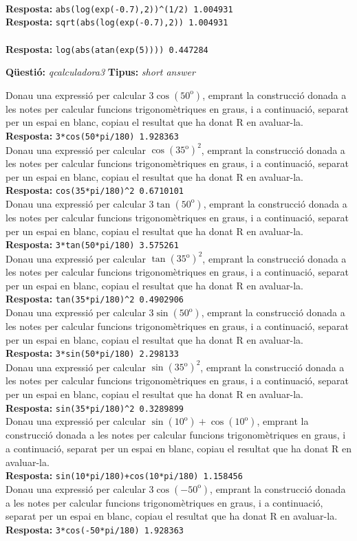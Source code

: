 \documentclass[10pt]{article}
\newcommand{\answer}{\textbf{Resposta: }}
\newcommand{\newquestion}[2]{\noindent\textbf{Qüestió: }\emph{#1} \textbf{Tipus: }\emph{#2}\medskip}
\begin{document}
\\
\answer{\verb?abs(log(exp(-0.7),2))^(1/2) 1.004931?}\\
\answer{\verb?sqrt(abs(log(exp(-0.7),2)) 1.004931?}\\

\\
\answer{\verb?log(abs(atan(exp(5)))) 0.447284?}\\

\newpage

\newquestion{qcalculadora3}{short answer} 
\def\qcalculadora3#1{Donau una expressió per calcular $#1$, emprant la construcció donada a les notes per calcular funcions trigonomètriques en graus, i a continuació, separat per un espai en blanc, copiau el resultat que ha donat R en avaluar-la.}

\qcalculadora3{3\cos(50^{\mathrm{o}})}\\
\answer{\verb?3*cos(50*pi/180) 1.928363?}\\

\qcalculadora3{\cos(35^{\mathrm{o}})^2}\\
\answer{\verb?cos(35*pi/180)^2 0.6710101?}\\

\qcalculadora3{3\tan(50^{\mathrm{o}})}\\
\answer{\verb?3*tan(50*pi/180) 3.575261?}\\

\qcalculadora3{\tan(35^{\mathrm{o}})^2}\\
\answer{\verb?tan(35*pi/180)^2 0.4902906?}\\

\qcalculadora3{3\sin(50^{\mathrm{o}})}\\
\answer{\verb?3*sin(50*pi/180) 2.298133?}\\

\qcalculadora3{\sin(35^{\mathrm{o}})^2}\\
\answer{\verb?sin(35*pi/180)^2 0.3289899?}\\

\qcalculadora3{\sin(10^{\mathrm{o}})+\cos(10^{\mathrm{o}})}\\
\answer{\verb?sin(10*pi/180)+cos(10*pi/180) 1.158456?}\\

\qcalculadora3{3\cos(-50^{\mathrm{o}})}\\
\answer{\verb?3*cos(-50*pi/180) 1.928363?}\\


\newpage
\end{document}
